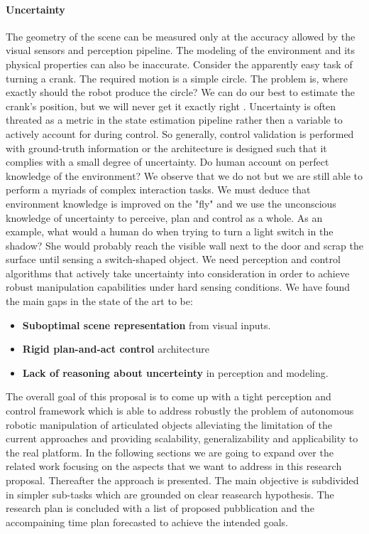 \paragraph{Uncertainty} The geometry of the scene can be measured only at the accuracy allowed by the visual sensors and perception pipeline. The modeling of the environment and its physical properties can also be inaccurate. Consider the apparently easy task of turning a crank. The required motion is a simple circle. The problem is, where exactly should the robot produce the circle? We can do our best to estimate the crank’s position, but we will never get it exactly right \citep{mason2018toward}. Uncertainty is often threated as a metric in the state estimation pipeline rather then a variable to actively account for during control. So generally, control validation is performed with ground-truth information or the architecture is designed such that it complies with a small degree of uncertainty. Do human account on perfect knowledge of the environment? We observe that we do not but we are still able to perform a myriads of complex interaction tasks. We must deduce that environment knowledge is improved on the "fly" and we use the unconscious knowledge of uncertainty to perceive, plan and control as a whole. As an example, what would a human do when trying to turn a light switch in the shadow? She would probably reach the visible wall next to the door and scrap the surface until sensing a switch-shaped object. We need perception and control algorithms that actively take uncertainty into consideration in order to achieve robust manipulation capabilities under hard sensing conditions.   
\medskip 
\newline
We have found the main gaps in the state of the art to be:
\begin{itemize}
\item \textbf{Suboptimal scene representation} from visual inputs.
\item \textbf{Rigid plan-and-act control} architecture
\item \textbf{Lack of reasoning about uncerteinty} in perception and modeling. 
\end{itemize}


The overall goal of this proposal is to come up with a tight perception and control framework which is able to address robustly the problem of autonomous robotic manipulation of articulated objects alleviating the limitation of the current approaches and providing scalability, generalizability and applicability to the real platform. In the following sections we are going to expand over the related work focusing on the aspects that we want to address in this research proposal. Thereafter the approach is presented. The main objective is subdivided in simpler sub-tasks which are grounded on clear reasearch hypothesis. The research plan is concluded with a list of proposed pubblication and the accompaining time plan forecasted to achieve the intended goals. 
